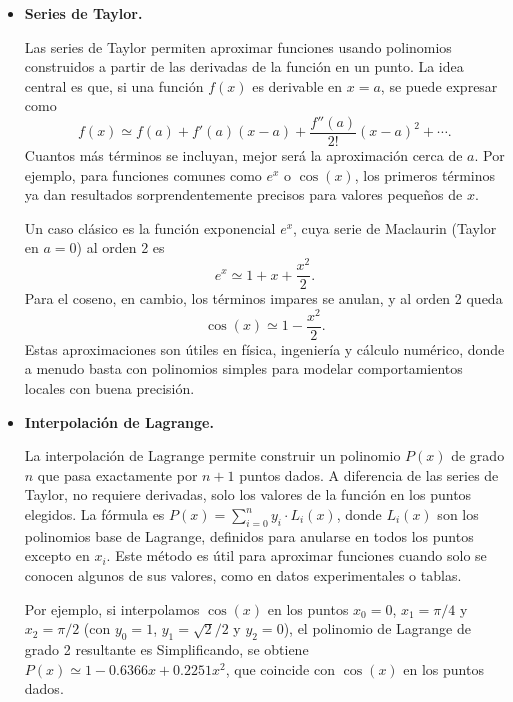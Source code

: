 \documentclass[12pt, a4paper]{article}
\theoremstyle{rioplatense}
\begin{document}
\begin{itemize}
    \item \textbf{Series de Taylor.} %

Las series de Taylor permiten aproximar funciones usando polinomios construidos a partir de las derivadas de la función en un punto. La idea central es que, si una función \( f(x) \) es derivable en \( x = a \), se puede expresar como \[ f(x) \simeq f(a) + f'(a)(x-a) + \frac{f''(a)}{2!}(x-a)^2 + \cdots.\] Cuantos más términos se incluyan, mejor será la aproximación cerca de \( a \). Por ejemplo, para funciones comunes como \( e^x \) o \( \cos(x) \), los primeros términos ya dan resultados sorprendentemente precisos para valores pequeños de \( x \).

Un caso clásico es la función exponencial \( e^x \), cuya serie de Maclaurin (Taylor en \( a=0 \)) al orden 2 es \[ e^x \simeq 1 + x + \frac{x^2}{2} .\] Para el coseno, en cambio, los términos impares se anulan, y al orden 2 queda \[ \cos(x) \simeq 1 - \frac{x^2}{2}.\] Estas aproximaciones son útiles en física, ingeniería y cálculo numérico, donde a menudo basta con polinomios simples para modelar comportamientos locales con buena precisión.

    \item \textbf{Interpolación de Lagrange.} %


La interpolación de Lagrange permite construir un polinomio \( P(x) \) de grado \( n \) que pasa exactamente por \( n+1 \) puntos dados. A diferencia de las series de Taylor, no requiere derivadas, solo los valores de la función en los puntos elegidos. La fórmula es \( P(x) = \sum_{i=0}^n y_i \cdot L_i(x) \), donde \( L_i(x) \) son los polinomios base de Lagrange, definidos para anularse en todos los puntos excepto en \( x_i \). Este método es útil para aproximar funciones cuando solo se conocen algunos de sus valores, como en datos experimentales o tablas.

Por ejemplo, si interpolamos \( \cos(x) \) en los puntos \( x_0 = 0 \), \( x_1 = \pi/4 \) y \( x_2 = \pi/2 \) (con \( y_0 = 1 \), \( y_1 = \sqrt{2}/2 \) y \( y_2 = 0 \)), el polinomio de Lagrange de grado 2 resultante es
Simplificando, se obtiene 
\( P(x) \simeq 1 - 0.6366x + 0.2251x^2 \), que coincide con \( \cos(x) \) en los puntos dados.
    

\end{itemize}
\end{document}
